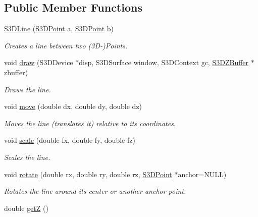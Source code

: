 \subsection*{Public Member Functions}
\begin{DoxyCompactItemize}
\item 
\hyperlink{class_s3_d_line_ae6eeda40b82f27193b1d1165a8fb3e63}{S3DLine} (\hyperlink{class_s3_d_point}{S3DPoint} a, \hyperlink{class_s3_d_point}{S3DPoint} b)
\begin{DoxyCompactList}\small\item\em Creates a line between two (3D-\/)Points. \item\end{DoxyCompactList}\item 
void \hyperlink{class_s3_d_line_aa7732c2d83fecb5d9934863d0e7875c1}{draw} (S3DDevice $\ast$disp, S3DSurface window, S3DContext gc, \hyperlink{class_s3_d_z_buffer}{S3DZBuffer} $\ast$zbuffer)
\begin{DoxyCompactList}\small\item\em Draws the line. \item\end{DoxyCompactList}\item 
void \hyperlink{class_s3_d_line_a38203e499c32f14ff5da3b7c17861881}{move} (double dx, double dy, double dz)
\begin{DoxyCompactList}\small\item\em Moves the line (translates it) relative to its coordinates. \item\end{DoxyCompactList}\item 
void \hyperlink{class_s3_d_line_a49a646c9b24de7847eb45cac31dd3a27}{scale} (double fx, double fy, double fz)
\begin{DoxyCompactList}\small\item\em Scales the line. \item\end{DoxyCompactList}\item 
void \hyperlink{class_s3_d_line_a4d23495df2c8f45855d8b80d30b01d30}{rotate} (double rx, double ry, double rz, \hyperlink{class_s3_d_point}{S3DPoint} $\ast$anchor=NULL)
\begin{DoxyCompactList}\small\item\em Rotates the line around its center or another anchor point. \item\end{DoxyCompactList}\item 
double \hyperlink{class_s3_d_line_a72aabdbb4d3d0c3ea36f5fda7b059f6a}{getZ} ()

\end{DoxyCompactItemize}
